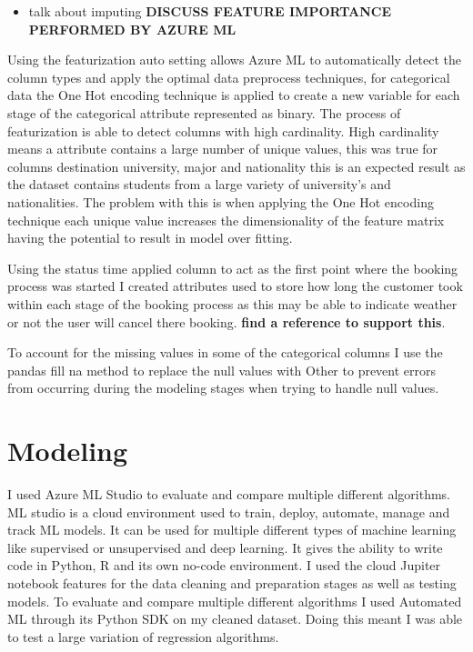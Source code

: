 \begin{itemize}
\item talk about imputing \textbf{DISCUSS FEATURE IMPORTANCE PERFORMED BY AZURE ML}
\end{itemize}


Using the featurization auto setting allows Azure ML to automatically detect the column types and apply the optimal data preprocess techniques, for categorical data the One Hot encoding technique is applied to create a new variable for each stage of the categorical attribute represented as binary. The process of featurization is able to detect columns with high cardinality.  High cardinality means a attribute contains a large number of unique values, this was true for columns destination university, major and nationality this is an expected result as the dataset contains students from a large variety of university's and nationalities. The problem with this is when applying the One Hot encoding technique each unique value increases the dimensionality of the feature matrix having the potential to result in model over fitting.


Using the status time applied column to act as the first point where the booking process was started I created attributes used to store how long the customer took within each stage of the booking process as this may be able to indicate weather or not the user will cancel there booking.  \textbf{find a reference to support this}.

To account for the missing values in some of the categorical columns I use the pandas fill na method to replace the null values with Other  to prevent errors from occurring during the modeling stages when trying to handle null values.

\section{Modeling}

I used Azure ML Studio to evaluate and compare multiple different algorithms. ML studio is a cloud environment used to train, deploy, automate, manage and track ML models. It can be used for multiple different types of machine learning like supervised or unsupervised and deep learning. It gives the ability to write code in Python, R and its own no-code environment.  I used the cloud Jupiter notebook features for the data cleaning and preparation stages as well as testing models. To evaluate and compare multiple different algorithms I used Automated ML through its Python SDK on my cleaned dataset. Doing this meant I was able to test a large variation of regression algorithms.

